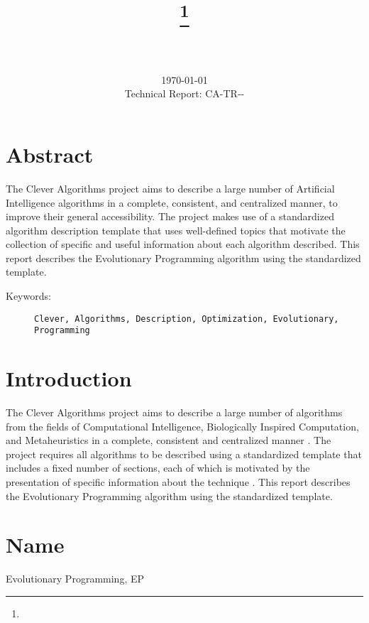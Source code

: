 \documentclass[a4paper, 11pt]{article}
\title{{\myreporttitle}\footnote{\myreportlicense}}
\author{\myreportauthor\\{\myreportemail}\\\small\myreportproject}
\date{\today\\{\small{Technical Report: CA-TR-{\myreportdate}-\myreportversion}}}
\begin{document}
\maketitle

\section*{Abstract} 
The Clever Algorithms project aims to describe a large number of Artificial Intelligence algorithms in a complete, consistent, and centralized manner, to improve their general accessibility. 
The project makes use of a standardized algorithm description template that uses well-defined topics that motivate the collection of specific and useful information about each algorithm described.
This report describes the Evolutionary Programming algorithm using the standardized template.

\begin{description}
	\item[Keywords:] {\small\texttt{Clever, Algorithms, Description, Optimization, Evolutionary, Programming}}
\end{description} 

\section{Introduction} 
\label{sec:intro}
The Clever Algorithms project aims to describe a large number of algorithms from the fields of Computational Intelligence, Biologically Inspired Computation, and Metaheuristics in a complete, consistent and centralized manner \cite{Brownlee2010}.
The project requires all algorithms to be described using a standardized template that includes a fixed number of sections, each of which is motivated by the presentation of specific information about the technique \cite{Brownlee2010a}.
This report describes the Evolutionary Programming algorithm using the standardized template.

\section{Name} 
\label{sec:name}
Evolutionary Programming, EP
\end{document}
